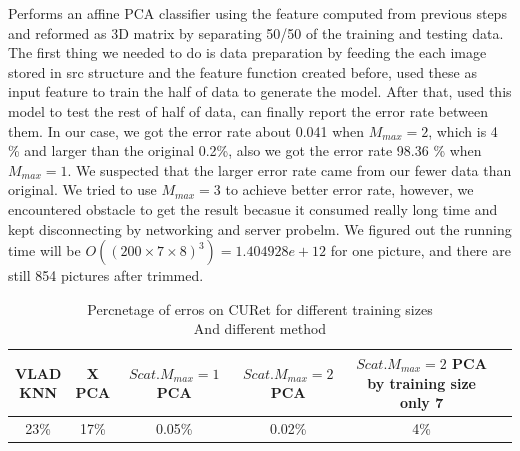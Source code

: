 \documentclass[final,leqno,onefignum,onetabnum]{siamltexmm}
\begin{document}
\begin{description}
	Performs an affine PCA classifier using the feature computed from previous steps and reformed as 3D matrix by separating 50/50 of the training and testing data. The first thing we needed to do is data preparation by feeding the each image stored in src structure and the feature function created before, used these as input feature to train the half of data to generate the model. After that, used this model to test the rest of half of data, can finally report the error rate between them. In our case, we got the error rate about 0.041 when $M_{max} = 2$, which is 4 \% and larger than the original 0.2\%, also we got the error rate 98.36 \% when $M_{max} = 1$. We suspected that the larger error rate came from our fewer data than original. We tried to use $M_{max} = 3$ to achieve better error rate, however, we encountered obstacle to get the result becasue it consumed really long time and kept disconnecting by networking and server probelm. We figured out the running time will be $O((200 \times 7 \times 8)^3) = 1.404928e+12$ for one picture, and there are still 854 pictures after trimmed. 
\end{description}

	\begin{table}[htbp]
		\caption{Percnetage of erros on CURet for different training sizes \\
		And different method	}
		\label{baseline_evaluation}
		\begin{center}\footnotesize
			\renewcommand{\arraystretch}{1.3}
			\begin{tabular}{|c|c|c|c|c|c|}\hline
				\makecell{ VLAD \\ \bf KNN} &
				\makecell{ X \\ \bf PCA} & 
			    \makecell{ $Scat. M_{max} = 1$ \\ \bf PCA} & 
			    \makecell{\bf $Scat. M_{max} = 2$ \\  \bf PCA} & 
			    \makecell{\bf $Scat. M_{max} = 2$ \\  \bf PCA by training size only 7}\\ \hline\hline
				23\% & 17\% & 0.05\% & 0.02\% &  4\% \\\hline
			
			\end{tabular}
		\end{center}
	\end{table}
\end{document}
